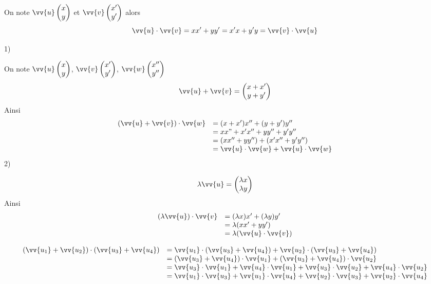 \begin{preuve}
On note $\vv{u}\covec{x}{y}$ et $\vv{v} \covec{x'}{y'}$ alors 
$$\vv{u} \cdot \vv{v} = xx'+yy' = x'x+y'y = \vv{v}\cdot\vv{u}$$
\end{preuve}
\newline

\begin{preuve}
1)\newline

On note $\vv{u} \covec{x}{y}$, $\vv{v} \covec{x'}{y'}$, $\vv{w} \covec{x''}{y''}$
$$\vv{u} + \vv{v} = \covec{x+x'}{y+y'}$$
Ainsi 
$$
\begin{array}{l l}
(\vv{u} + \vv{v})\cdot\vv{w} &= (x+x')x'' + (y+y')y''\\
& = xx"+x'x'' + yy'' + y'y''\\
& = (xx'' + yy'') + (x'x'' + y'y'')\\
& = \vv{u}\cdot\vv{w} + \vv{u}\cdot\vv{w}\\
\end{array}
$$
2)\newline

$$\lambda \vv{u} = \covec{\lambda x}{\lambda y}$$
Ainsi 
$$
\begin{array}{l l}
(\lambda \vv{u})\cdot \vv{v} &= (\lambda x)x' + (\lambda y)y'\\
& = \lambda(xx' + yy')\\
&= \lambda(\vv{u}\cdot \vv{v})\\
\end{array}
$$
\end{preuve}
\newline

\begin{preuve}
$$\begin{array}{l l} 
(\vv{u_1} + \vv{u_2})\cdot(\vv{u_3} + \vv{u_4}) &= \vv{u_1}\cdot(\vv{u_3} + \vv{u_4}) + \vv{u_2}\cdot(\vv{u_3} + \vv{u_4})\\
& = (\vv{u_3} + \vv{u_4})\cdot\vv{u_1} + (\vv{u_3} + \vv{u_4})\cdot\vv{u_2}\\
& = \vv{u_3}\cdot\vv{u_1} + \vv{u_4}\cdot\vv{u_1} + \vv{u_3}\cdot\vv{u_2} + \vv{u_4}\cdot\vv{u_2}\\
& = \vv{u_1}\cdot\vv{u_3} + \vv{u_1}\cdot\vv{u_4} + \vv{u_2}\cdot\vv{u_3} + \vv{u_2}\cdot\vv{u_4}\\
\end{array}$$
\end{preuve}
\newline

